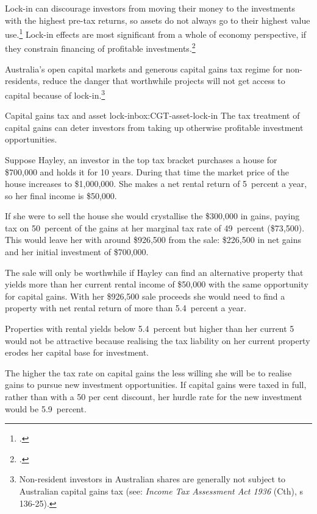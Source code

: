\documentclass{grattanAlpha}
\begin{document}
Lock-in can discourage investors from moving their money to the investments with the highest pre-tax returns, so assets do not always go to their highest value use.\footcite{Lindsey1987}  Lock-in effects are most significant from a whole of economy perspective, if they constrain financing of profitable investments.\footcites{OECD2006TaxationOfCapitalGains}{Johnson2008}  

\newcommand{\Act}[2]{\textit{#1} (#2)}
Australia’s open capital markets and generous capital gains tax regime for non-residents, reduce the danger that worthwhile projects will not get access to capital because of lock-in.\footnote{Non-resident investors in Australian shares are generally not subject to Australian capital gains tax (see: \Act{Income Tax Assessment Act 1936}{Cth}, s 136-25). } 


\begin{smallbox}[!hp]{Capital gains tax and asset lock-in}{box:CGT-asset-lock-in}
The tax treatment of capital gains can deter investors from taking up otherwise profitable investment opportunities. 



Suppose Hayley, an investor in the top tax bracket purchases a house for \$700,000 and holds it for 10 years. During that time the market price of the house increases to \$1,000,000. She makes a net rental return of 5~percent a year, so her  final income is \$50,000. 

If she were to sell the house she would crystallise the \$300,000 in gains, paying tax on 50~percent of the gains at her marginal tax rate of 49~percent (\$73,500). This would leave her with around \$926,500 from the sale: \$226,500 in net gains and her initial investment of \$700,000. 

The sale will only be worthwhile if Hayley can find an alternative property that yields more than her current rental income of \$50,000  with the same opportunity for capital gains. With her \$926,500 sale proceeds she would need to find a property with net rental return of more than 5.4~percent a year. 

Properties with rental yields below 5.4~percent but higher than her current 5 would not be attractive because realising the tax liability on her current property erodes her capital base for investment.  

The higher the tax rate on capital gains the less willing she will be to realise gains to pursue new investment opportunities. If capital gains were taxed in full, rather than with a 50 per cent discount, her hurdle rate for the new investment would be 5.9~percent.
\end{smallbox}
\end{document}
